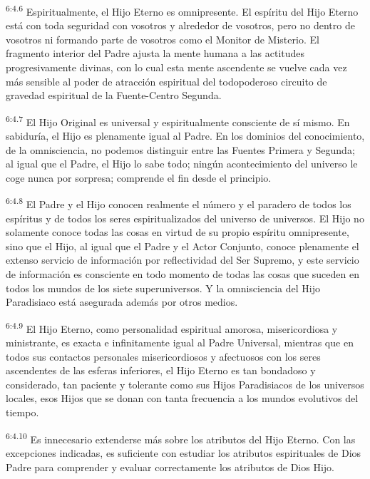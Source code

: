 \par
\textsuperscript{6:4.6} Espiritualmente, el Hijo Eterno es omnipresente. El espíritu del Hijo Eterno está con toda seguridad con vosotros y alrededor de vosotros, pero no dentro de vosotros ni formando parte de vosotros como el Monitor de Misterio. El fragmento interior del Padre ajusta la mente humana a las actitudes progresivamente divinas, con lo cual esta mente ascendente se vuelve cada vez más sensible al poder de atracción espiritual del todopoderoso circuito de gravedad espiritual de la Fuente-Centro Segunda.

\par
\textsuperscript{6:4.7} El Hijo Original es universal y espiritualmente consciente de sí mismo. En sabiduría, el Hijo es plenamente igual al Padre. En los dominios del conocimiento, de la omnisciencia, no podemos distinguir entre las Fuentes Primera y Segunda; al igual que el Padre, el Hijo lo sabe todo; ningún acontecimiento del universo le coge nunca por sorpresa; comprende el fin desde el principio.

\par
\textsuperscript{6:4.8} El Padre y el Hijo conocen realmente el número y el paradero de todos los espíritus y de todos los seres espiritualizados del universo de universos. El Hijo no solamente conoce todas las cosas en virtud de su propio espíritu omnipresente, sino que el Hijo, al igual que el Padre y el Actor Conjunto, conoce plenamente el extenso servicio de información por reflectividad del Ser Supremo, y este servicio de información es consciente en todo momento de todas las cosas que suceden en todos los mundos de los siete superuniversos. Y la omnisciencia del Hijo Paradisiaco está asegurada además por otros medios.

\par
\textsuperscript{6:4.9} El Hijo Eterno, como personalidad espiritual amorosa, misericordiosa y ministrante, es exacta e infinitamente igual al Padre Universal, mientras que en todos sus contactos personales misericordiosos y afectuosos con los seres ascendentes de las esferas inferiores, el Hijo Eterno es tan bondadoso y considerado, tan paciente y tolerante como sus Hijos Paradisiacos de los universos locales, esos Hijos que se donan con tanta frecuencia a los mundos evolutivos del tiempo.

\par
\textsuperscript{6:4.10} Es innecesario extenderse más sobre los atributos del Hijo Eterno. Con las excepciones indicadas, es suficiente con estudiar los atributos espirituales de Dios Padre para comprender y evaluar correctamente los atributos de Dios Hijo.

